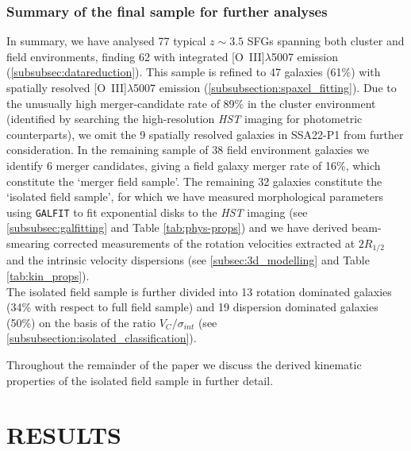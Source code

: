\documentclass[fleqn,usenatbib]{mn2e}
\begin{document}
\subsubsection{Summary of the final sample for further analyses}\label{subsubsec:kin_sample_summary}
In summary, we have analysed 77 typical $z\sim3.5$ SFGs spanning both cluster and field environments, finding 62 with integrated [O~{\sc III}]$\lambda$5007 emission (\cref{subsubsec:datareduction}).
This sample is refined to 47 galaxies (61\%) with spatially resolved [O~{\sc III}]$\lambda$5007 emission (\cref{subsubsection:spaxel_fitting}).
Due to the unusually high merger-candidate rate of 89\% in the cluster environment (identified by searching the high-resolution {\em HST} imaging for photometric counterparts), we omit the 9 spatially resolved galaxies in SSA22-P1 from further consideration.
In the remaining sample of 38 field environment galaxies we identify 6 merger candidates, giving a field galaxy merger rate of 16\%, which constitute the `merger field sample'.
The remaining 32 galaxies constitute the `isolated field sample', for which we have measured morphological parameters using {\tt GALFIT} to fit exponential disks to the {\em HST} imaging (see \cref{subsubsec:galfitting} and Table \ref{tab:phys-props}) and we have derived beam-smearing corrected measurements of the rotation velocities extracted at $2R_{1/2}$ and the intrinsic velocity dispersions (see \cref{subsec:3d_modelling} and Table \ref{tab:kin_props}). \\

The isolated field sample is further divided into 13 rotation dominated galaxies (34\% with respect to full field sample) and 19 dispersion dominated galaxies (50\%) on the basis of the ratio $V_{C}/\sigma_{int}$ (see \cref{subsubsection:isolated_classification}).

Throughout the remainder of the paper we discuss the derived kinematic properties of the isolated field sample in further detail.

\section{RESULTS}\label{sec:results}
\end{document}
